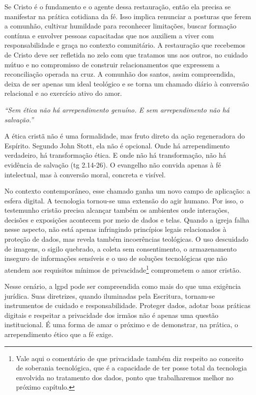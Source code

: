 Se Cristo é o fundamento e o agente dessa restauração, então ela precisa se manifestar na prática cotidiana da fé. Isso implica renunciar a posturas que ferem a comunhão, cultivar humildade para reconhecer limitações, buscar formação contínua e envolver pessoas capacitadas que nos auxiliem a viver com responsabilidade e graça no contexto comunitário. A restauração que recebemos de Cristo deve ser refletida no zelo com que tratamos uns aos outros, no cuidado mútuo e no compromisso de construir relacionamentos que expressem a reconciliação operada na cruz. A comunhão dos santos, assim compreendida, deixa de ser apenas um ideal teológico e se torna um chamado diário à conversão relacional e ao exercício ativo do amor.

\textit{``Sem ética não há arrependimento genuíno. E sem arrependimento não há salvação.''} \cite[p.~102]{stott2008}

A ética cristã não é uma formalidade, mas fruto direto da ação regeneradora do Espírito. Segundo John Stott, ela não é opcional. Onde há arrependimento verdadeiro, há transformação ética. E onde não há transformação, não há evidência de salvação (\gls{tg} 2.14-26). O evangelho não convida apenas à fé intelectual, mas à conversão moral, concreta e visível.

No contexto contemporâneo, esse chamado ganha um novo campo de aplicação: a esfera digital. A tecnologia tornou-se uma extensão do agir humano. Por isso, o testemunho cristão precisa alcançar também os ambientes onde interações, decisões e exposições acontecem por meio de dados e telas. Quando a igreja falha nesse aspecto, não está apenas infringindo princípios legais relacionados à proteção de dados, mas revela também incoerências teológicas. O uso descuidado de imagens, o sigilo quebrado, a coleta sem consentimento, o armazenamento inseguro de informações sensíveis e o uso de soluções tecnológicas que não atendem aos requisitos mínimos de privacidade\footnote{Vale aqui o comentário de que privacidade também diz respeito ao conceito de soberania tecnológica, que é a capacidade de ter posse total da tecnologia envolvida no tratamento dos dados, ponto que trabalharemos melhor no próximo capítulo.} comprometem o amor cristão.

Nesse cenário, a \gls{lgpd} pode ser compreendida como mais do que uma exigência jurídica. Suas diretrizes, quando iluminadas pela Escritura, tornam-se instrumentos de cuidado e responsabilidade. Proteger dados, adotar boas práticas digitais e respeitar a privacidade dos irmãos não é apenas uma questão institucional. É uma forma de amar o próximo e de demonstrar, na prática, o arrependimento ético que a fé exige.

